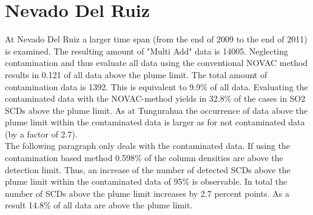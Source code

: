 \documentclass  [
  paper    = a4,
  BCOR     = 10mm,
  twoside,
  fontsize = 12pt,
  fleqn,
  toc      = bibnumbered,
  toc      = listofnumbered,
  numbers  = noendperiod,
  headings = normal,
  listof   = leveldown,
  version  = 3.03
]                                       {scrreprt}
\begin{document}
\section{Nevado Del Ruiz}
At Nevado Del Ruiz a larger time span (from the end of 2009 to the end of 2011) is examined. The resulting amount of "Multi Add" data is 14005.
Neglecting contamination and thus evaluate all data using the conventional NOVAC method results in 0.121 of all data above the plume limit. 
The total amount of contamination data is 1392. This is equivalent to 9.9\% of all data. Evaluating the contaminated data with the NOVAC-method yields in 32.8\% of the cases in SO2 SCDs above the plume limit. As at Tungurahua the occurrence of data above the plume limit within the contaminated data is larger as for not contaminated data (by a factor of 2.7).\\
The following paragraph only deals with the contaminated data.
If using the contamination based method 0.598\% of the  column densities are above the detection limit. Thus, an increase of the number of detected  SCDs above the plume limit within the contaminated data of 95\% is observable. In total the number of  SCDs above the plume limit increases by 2.7 percent points. As a result 14.8\% of all data are above the plume limit.\\
\FloatBarrier


%
%
%
\end{document}
